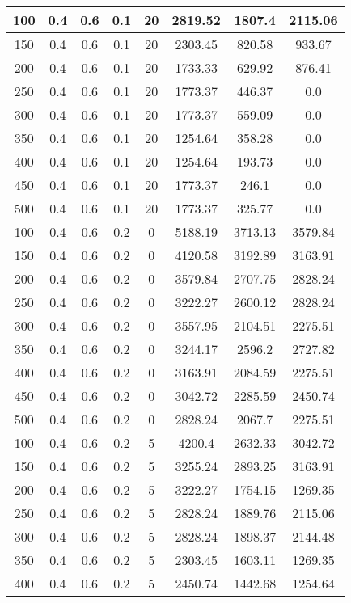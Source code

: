 \documentclass[a4paper, 12pt]{extreport}
\begin{document}
\begin{itemize}
\begin{longtable}{|c|c|c|c|c|c|c|c|}
			100 & 0.4 & 0.6 & 0.1 & 20 & 2819.52 & 1807.4 & 2115.06 \\\hline
			150 & 0.4 & 0.6 & 0.1 & 20 & 2303.45 & 820.58 & 933.67 \\\hline
			200 & 0.4 & 0.6 & 0.1 & 20 & 1733.33 & 629.92 & 876.41 \\\hline
			250 & 0.4 & 0.6 & 0.1 & 20 & 1773.37 & 446.37 & 0.0 \\\hline
			300 & 0.4 & 0.6 & 0.1 & 20 & 1773.37 & 559.09 & 0.0 \\\hline
			350 & 0.4 & 0.6 & 0.1 & 20 & 1254.64 & 358.28 & 0.0 \\\hline
			400 & 0.4 & 0.6 & 0.1 & 20 & 1254.64 & 193.73 & 0.0 \\\hline
			450 & 0.4 & 0.6 & 0.1 & 20 & 1773.37 & 246.1 & 0.0 \\\hline
			500 & 0.4 & 0.6 & 0.1 & 20 & 1773.37 & 325.77 & 0.0 \\\hline
			100 & 0.4 & 0.6 & 0.2 & 0 & 5188.19 & 3713.13 & 3579.84 \\\hline
			150 & 0.4 & 0.6 & 0.2 & 0 & 4120.58 & 3192.89 & 3163.91 \\\hline
			200 & 0.4 & 0.6 & 0.2 & 0 & 3579.84 & 2707.75 & 2828.24 \\\hline
			250 & 0.4 & 0.6 & 0.2 & 0 & 3222.27 & 2600.12 & 2828.24 \\\hline
			300 & 0.4 & 0.6 & 0.2 & 0 & 3557.95 & 2104.51 & 2275.51 \\\hline
			350 & 0.4 & 0.6 & 0.2 & 0 & 3244.17 & 2596.2 & 2727.82 \\\hline
			400 & 0.4 & 0.6 & 0.2 & 0 & 3163.91 & 2084.59 & 2275.51 \\\hline
			450 & 0.4 & 0.6 & 0.2 & 0 & 3042.72 & 2285.59 & 2450.74 \\\hline
			500 & 0.4 & 0.6 & 0.2 & 0 & 2828.24 & 2067.7 & 2275.51 \\\hline
			100 & 0.4 & 0.6 & 0.2 & 5 & 4200.4 & 2632.33 & 3042.72 \\\hline
			150 & 0.4 & 0.6 & 0.2 & 5 & 3255.24 & 2893.25 & 3163.91 \\\hline
			200 & 0.4 & 0.6 & 0.2 & 5 & 3222.27 & 1754.15 & 1269.35 \\\hline
			250 & 0.4 & 0.6 & 0.2 & 5 & 2828.24 & 1889.76 & 2115.06 \\\hline
			300 & 0.4 & 0.6 & 0.2 & 5 & 2828.24 & 1898.37 & 2144.48 \\\hline
			350 & 0.4 & 0.6 & 0.2 & 5 & 2303.45 & 1603.11 & 1269.35 \\\hline
			400 & 0.4 & 0.6 & 0.2 & 5 & 2450.74 & 1442.68 & 1254.64 \\\hline

\end{longtable}
\end{itemize}
\end{document}
